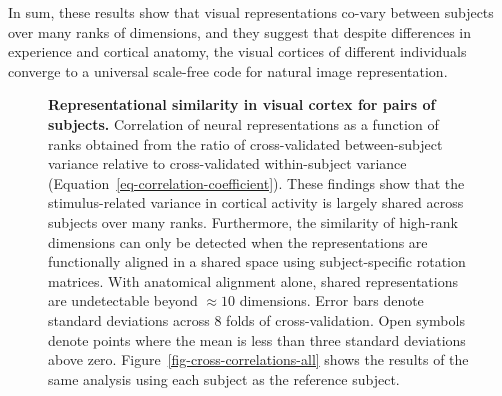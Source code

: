 \documentclass[10pt]{article}
\begin{document}
In sum, these results show that visual representations co-vary between
subjects over many ranks of dimensions, and they suggest that despite
differences in experience and cortical anatomy, the visual cortices of
different individuals converge to a universal scale-free code for
natural image representation.

\begin{figure}


\caption{\label{fig-cross-correlations}\textbf{Representational
similarity in visual cortex for pairs of subjects.} Correlation of
neural representations as a function of ranks obtained from the ratio of
cross-validated between-subject variance relative to cross-validated
within-subject variance (Equation~\ref{eq-correlation-coefficient}).
These findings show that the stimulus-related variance in cortical
activity is largely shared across subjects over many ranks. Furthermore,
the similarity of high-rank dimensions can only be detected when the
representations are functionally aligned in a shared space using
subject-specific rotation matrices. With anatomical alignment alone,
shared representations are undetectable beyond \(\approx 10\)
dimensions. Error bars denote standard deviations across 8 folds of
cross-validation. Open symbols denote points where the mean is less than
three standard deviations above zero.
Figure~\ref{fig-cross-correlations-all} shows the results of the same
analysis using each subject as the reference subject.}

\end{figure}%
\end{document}
